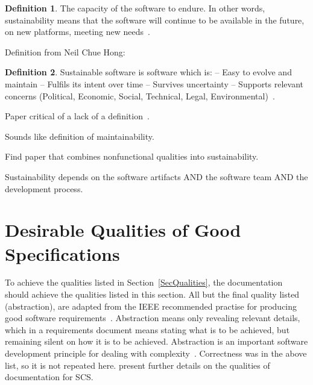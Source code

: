 \documentclass[letterpaper,cleveref]{lipics-v2019}
\theoremstyle{definition}
\newtheorem{defn}{Definition}
\begin{document}
\begin{defn}
  \noindent The capacity of the software to endure. In other words,
  sustainability means that the software will continue to be available in the
  future, on new platforms, meeting new needs~\cite{Katz2016}.
\end{defn}

Definition from Neil Chue Hong:
\begin{defn}
Sustainable software is software which is:
-- Easy to evolve and maintain
-- Fulfils its intent over time
-- Survives uncertainty
-- Supports relevant concerns (Political, Economic, Social, Technical,
Legal, Environmental)~\cite{Katz2016}.
\end{defn}

Paper critical of a lack of a definition~\cite{VentersEtAl2014}.

Sounds like definition of maintainability.

Find paper that combines nonfunctional qualities into sustainability.

Sustainability depends on the software artifacts AND the software team AND the
development process.

\section{Desirable Qualities of Good Specifications} \label{SecDesirableQs}

To achieve the qualities listed in Section~\ref{SecQualities}, the documentation
should achieve the qualities listed in this section.  All but the final quality
listed (abstraction), are adapted from the IEEE recommended practise for
producing good software requirements~\cite{IEEE1998}.  Abstraction means only
revealing relevant details, which in a requirements document means stating what
is to be achieved, but remaining silent on how it is to be achieved.
Abstraction is an important software development principle for dealing with
complexity~\cite[p.~40]{GhezziEtAl2003}.  Correctness was in the above list, so
it is not repeated here.  \citet{SmithAndKoothoor2016} present further details
on the qualities of documentation for SCS.
\end{document}
